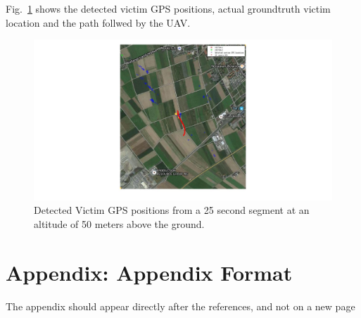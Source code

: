 \documentclass[runningheads]{llncs}
\begin{document}
Fig.~\ref{fig:victim_gps_small} shows the detected victim GPS positions, actual groundtruth victim location and the path follwed by the UAV.

\begin{figure}
\centerline{\includegraphics[scale=0.3]{img/victim_gps/victim_gps_on_map.jpg}}
\caption{Detected Victim GPS positions from a 25 second segment at an altitude of 50 meters above the ground.}
\label{fig:victim_gps_small}
\end{figure}











\nocite{bal:cha:gra:pae}



\section*{Appendix: Appendix Format}
The appendix should appear directly after the references, and not on a new page
\end{document}
